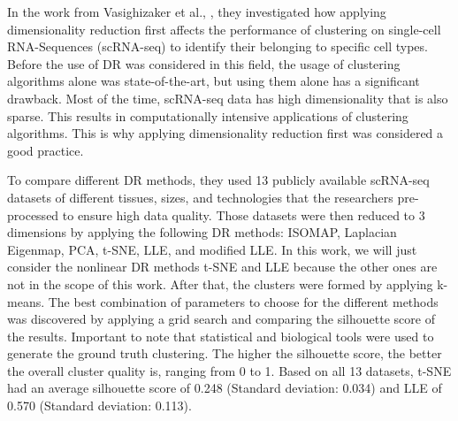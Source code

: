 In the work from Vasighizaker et al., \cite{Vasighizaker22}, they investigated how applying dimensionality reduction first affects the performance of clustering on single-cell RNA-Sequences (scRNA-seq) to identify their belonging to specific cell types. Before the use of DR was considered in this field, the usage of clustering algorithms alone was state-of-the-art, but using them alone has a significant drawback. Most of the time, scRNA-seq data has high dimensionality that is also sparse. This results in computationally intensive applications of clustering algorithms. This is why applying dimensionality reduction first was considered a good practice.

To compare different DR methods, they used 13 publicly available scRNA-seq datasets of different tissues, sizes, and technologies that the researchers pre-processed to ensure high data quality. Those datasets were then reduced to 3 dimensions by applying the following DR methods: ISOMAP, Laplacian Eigenmap, PCA, t-SNE, LLE, and modified LLE. In this work, we will just consider the nonlinear DR methods t-SNE and LLE because the other ones are not in the scope of this work. After that, the clusters were formed by applying k-means. The best combination of parameters to choose for the different methods was discovered by applying a grid search and comparing the silhouette score of the results. Important to note that statistical and biological tools were used to generate the ground truth clustering. The higher the silhouette score, the better the overall cluster quality is, ranging from 0 to 1. Based on all 13 datasets, t-SNE had an average silhouette score of 0.248 (Standard deviation: 0.034) and LLE of 0.570 (Standard deviation: 0.113). 

